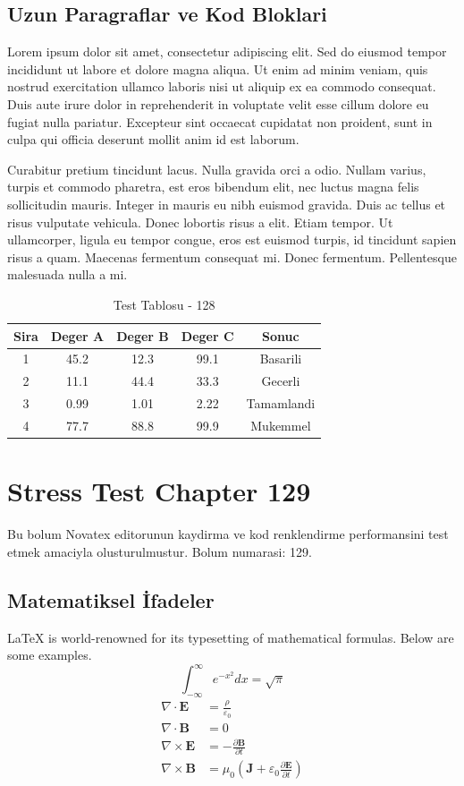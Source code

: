 \documentclass[12pt,a4paper]{article}
\begin{document}
\subsection{Uzun Paragraflar ve Kod Bloklari}
Lorem ipsum dolor sit amet, consectetur adipiscing elit. Sed do eiusmod tempor incididunt ut labore et dolore magna aliqua. Ut enim ad minim veniam, quis nostrud exercitation ullamco laboris nisi ut aliquip ex ea commodo consequat. Duis aute irure dolor in reprehenderit in voluptate velit esse cillum dolore eu fugiat nulla pariatur. Excepteur sint occaecat cupidatat non proident, sunt in culpa qui officia deserunt mollit anim id est laborum.

Curabitur pretium tincidunt lacus. Nulla gravida orci a odio. Nullam varius, turpis et commodo pharetra, est eros bibendum elit, nec luctus magna felis sollicitudin mauris. Integer in mauris eu nibh euismod gravida. Duis ac tellus et risus vulputate vehicula. Donec lobortis risus a elit. Etiam tempor. Ut ullamcorper, ligula eu tempor congue, eros est euismod turpis, id tincidunt sapien risus a quam. Maecenas fermentum consequat mi. Donec fermentum. Pellentesque malesuada nulla a mi.

\begin{table}[h!]
\centering
\begin{tabular}{|c|c|c|c|c|}
\hline
\textbf{Sira} & \textbf{Deger A} & \textbf{Deger B} & \textbf{Deger C} & \textbf{Sonuc} \\
\hline
1 & 45.2 & 12.3 & 99.1 & Basarili \\
2 & 11.1 & 44.4 & 33.3 & Gecerli \\
3 & 0.99 & 1.01 & 2.22 & Tamamlandi \\
4 & 77.7 & 88.8 & 99.9 & Mukemmel \\
\hline
\end{tabular}
\caption{Test Tablosu - 128}
\end{table}

\newpage
\section{Stress Test Chapter 129}
Bu bolum Novatex editorunun kaydirma ve kod renklendirme performansini test etmek amaciyla olusturulmustur. Bolum numarasi: 129.

\subsection{Matematiksel İfadeler}
\LaTeX{} is world-renowned for its typesetting of mathematical formulas. Below are some examples.
\begin{equation}
\int_{-\infty}^{\infty} e^{-x^2} dx = \sqrt{\pi}
\end{equation}
\begin{align}
\nabla \cdot \mathbf{E} &= \frac{\rho}{\varepsilon_0} \\
\nabla \cdot \mathbf{B} &= 0 \\
\nabla \times \mathbf{E} &= -\frac{\partial \mathbf{B}}{\partial t} \\
\nabla \times \mathbf{B} &= \mu_0\left(\mathbf{J} + \varepsilon_0 \frac{\partial \mathbf{E}}{\partial t}\right)
\end{align}
\end{document}
